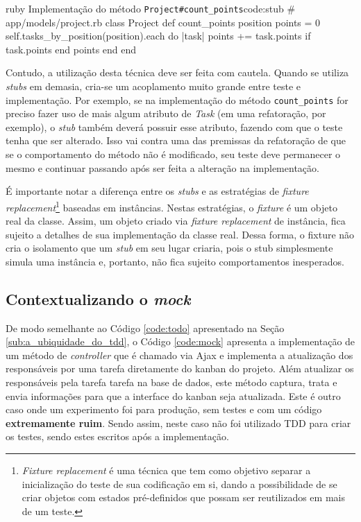 \begin{mycode}{ruby}%
{Implementação do método \texttt{Project\#count\_points}}{code:stub}
# app/models/project.rb
class Project
  def count_points position
    points = 0
    self.tasks_by_position(position).each do |task|
      points += task.points if task.points
    end
    points
  end
end
\end{mycode}

Contudo, a utilização desta técnica deve ser feita com cautela. Quando se utiliza \textit{stubs} em demasia, cria-se um acoplamento muito grande entre teste e implementação. Por exemplo, se na implementação do método \texttt{count\_points} for preciso fazer uso de mais algum atributo de \textit{Task} (em uma refatoração, por exemplo), o \textit{stub} também deverá possuir esse atributo, fazendo com que o teste tenha que ser alterado. Isso vai contra uma das premissas da refatoração de que se o comportamento do método não é modificado, seu teste deve permanecer o mesmo e continuar passando após ser feita a alteração na implementação.

É importante notar a diferença entre os \textit{stubs} e as estratégias de \textit{fixture replacement}\footnote{\textit{Fixture replacement} é uma técnica que tem como objetivo separar a inicialização do teste de sua codificação em si, dando a possibilidade de se criar objetos com estados pré-definidos que possam ser reutilizados em mais de um teste.} baseadas em instâncias. Nestas estratégias, o \textit{fixture} é um objeto real da classe. Assim, um objeto criado via \textit{fixture replacement} de instância, fica sujeito a detalhes de sua implementação da classe real. Dessa forma, o {fixture} não cria o isolamento que um \textit{stub} em seu lugar criaria, pois o stub simplesmente simula uma instância e, portanto, não fica sujeito comportamentos inesperados.


\subsection{Contextualizando o \textit{mock}}
\label{sub:contextualizando_o_mock}

De modo semelhante ao Código \ref{code:todo} apresentado na Seção \ref{sub:a_ubiquidade_do_tdd}, o Código \ref{code:mock} apresenta a implementação de um método de \textit{controller} que é chamado via Ajax e implementa a atualização dos responsáveis por uma tarefa diretamente do kanban do projeto. Além atualizar os responsáveis pela tarefa tarefa na base de dados, este método captura, trata e envia informações para que a interface do kanban seja atualizada. Este é outro caso onde um experimento foi para produção, sem testes e com um código \textbf{extremamente ruim}. Sendo assim, neste caso não foi utilizado TDD para criar os testes, sendo estes escritos após a implementação.

